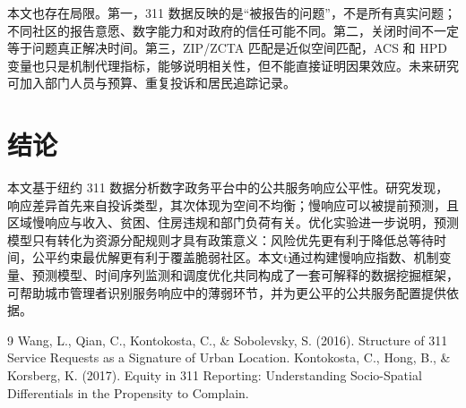 \documentclass[UTF8,a4paper,12pt]{ctexart}
\begin{document}
本文也存在局限。第一，311 数据反映的是“被报告的问题”，不是所有真实问题；不同社区的报告意愿、数字能力和对政府的信任可能不同。第二，关闭时间不一定等于问题真正解决时间。第三，ZIP/ZCTA 匹配是近似空间匹配，ACS 和 HPD 变量也只是机制代理指标，能够说明相关性，但不能直接证明因果效应。未来研究可加入部门人员与预算、重复投诉和居民追踪记录。

\section{结论}

本文基于纽约 311 数据分析数字政务平台中的公共服务响应公平性。研究发现，响应差异首先来自投诉类型，其次体现为空间不均衡；慢响应可以被提前预测，且区域慢响应与收入、贫困、住房违规和部门负荷有关。优化实验进一步说明，预测模型只有转化为资源分配规则才具有政策意义：风险优先更有利于降低总等待时间，公平约束最优解更有利于覆盖脆弱社区。本文t通过构建慢响应指数、机制变量、预测模型、时间序列监测和调度优化共同构成了一套可解释的数据挖掘框架，可帮助城市管理者识别服务响应中的薄弱环节，并为更公平的公共服务配置提供依据。

\begin{thebibliography}{9}
 Wang, L., Qian, C., Kontokosta, C., \& Sobolevsky, S. (2016). Structure of 311 Service Requests as a Signature of Urban Location.
 Kontokosta, C., Hong, B., \& Korsberg, K. (2017). Equity in 311 Reporting: Understanding Socio-Spatial Differentials in the Propensity to Complain.
\end{thebibliography}
\end{document}
